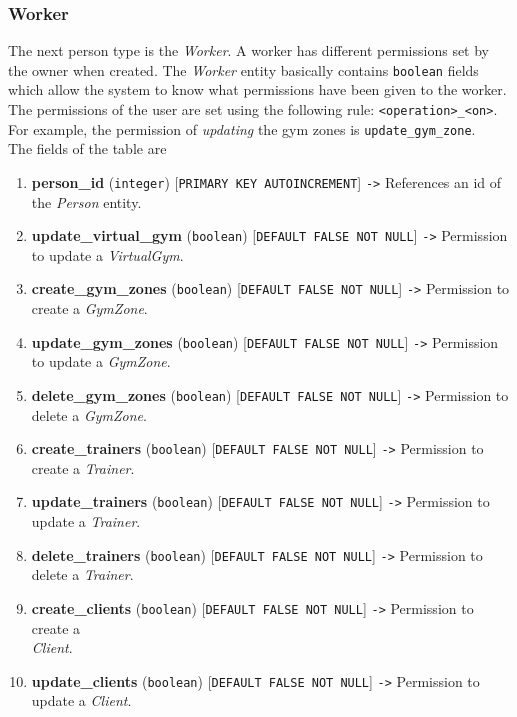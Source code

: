 \documentclass[a4paper, 12pt, oneside]{book}
\begin{document}
\subsubsection{Worker}
The next person type is the \emph{Worker}. A worker has different permissions set by the owner when created. The \emph{Worker} entity basically contains \texttt{boolean} fields which allow the system to know what permissions have been given to the worker. The permissions of the user are set using the following rule: \texttt{<operation>\_<on>}. For example, the permission of \emph{updating} the gym zones is \texttt{update\_gym\_zone}.
\\[8pt]
The fields of the table are
\begin{enumerate}[label = -]
	\item \textbf{person\_id} (\texttt{integer}) [\texttt{PRIMARY KEY AUTOINCREMENT}] \texttt{->} References an id of the \emph{Person} entity.
	\item \textbf{update\_virtual\_gym} (\texttt{boolean}) [\texttt{DEFAULT FALSE NOT NULL}] \texttt{->} Permission to update a \emph{VirtualGym}.
	\item \textbf{create\_gym\_zones} (\texttt{boolean}) [\texttt{DEFAULT FALSE NOT NULL}] \texttt{->} Permission to create a \emph{GymZone}.
	\item \textbf{update\_gym\_zones} (\texttt{boolean}) [\texttt{DEFAULT FALSE NOT NULL}] \texttt{->} Permission to update a \emph{GymZone}.
	\item \textbf{delete\_gym\_zones} (\texttt{boolean}) [\texttt{DEFAULT FALSE NOT NULL}] \texttt{->} Permission to\\delete a \emph{GymZone}.
	\item \textbf{create\_trainers} (\texttt{boolean}) [\texttt{DEFAULT FALSE NOT NULL}] \texttt{->} Permission to create a \emph{Trainer}.
	\item \textbf{update\_trainers} (\texttt{boolean}) [\texttt{DEFAULT FALSE NOT NULL}] \texttt{->} Permission to update a \emph{Trainer}.
	\item \textbf{delete\_trainers} (\texttt{boolean}) [\texttt{DEFAULT FALSE NOT NULL}] \texttt{->} Permission to delete a \emph{Trainer}.
	\item \textbf{create\_clients} (\texttt{boolean}) [\texttt{DEFAULT FALSE NOT NULL}] \texttt{->} Permission to create a\\\emph{Client}.
	\item \textbf{update\_clients} (\texttt{boolean}) [\texttt{DEFAULT FALSE NOT NULL}] \texttt{->} Permission to update a \emph{Client}.

\end{enumerate}
\end{document}
